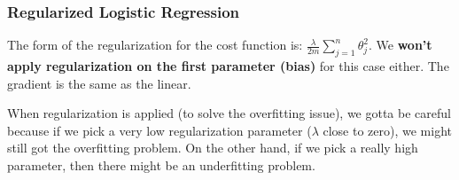\subsubsection{Regularized Logistic Regression}
The form of the regularization for the cost function is: $\frac{\lambda}{2m}\sum^n_{j=1}\theta^2_j$. We \textbf{won't apply regularization on the first parameter (bias)} for this case either. The gradient is the same as the linear.

\noindent When regularization is applied (to solve the overfitting issue), we gotta be careful because if we pick a very low regularization parameter ($\lambda$ close to zero), we might still got the overfitting problem. On the other hand, if we pick a really high parameter, then there might be an underfitting problem.